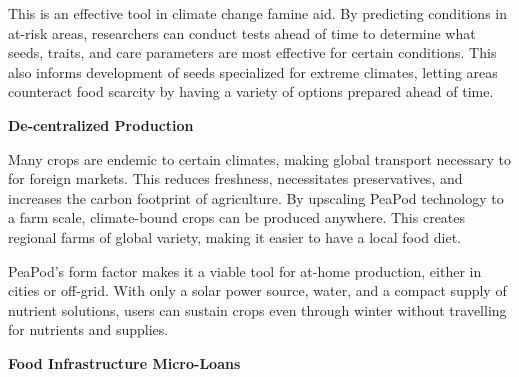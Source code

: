 \documentclass{report}
\begin{document}
This is an effective tool in climate change famine aid. By predicting conditions in at-risk areas, researchers can conduct tests ahead of time to determine what seeds, traits, and care parameters are most effective for certain conditions. This also informs development of seeds specialized for extreme climates, letting areas counteract food scarcity by having a variety of options prepared ahead of time.

\textbf{De-centralized Production}

Many crops are endemic to certain climates, making global transport necessary to for foreign markets. This reduces freshness, necessitates preservatives, and increases the carbon footprint of agriculture. By upscaling PeaPod technology to a farm scale, climate-bound crops can be produced anywhere. This creates regional farms of global variety, making it easier to have a local food diet.

PeaPod's form factor makes it a viable tool for at-home production, either in cities or off-grid. With only a solar power source, water, and a compact supply of nutrient solutions, users can sustain crops even through winter without travelling for nutrients and supplies.





\textbf{Food Infrastructure Micro-Loans}
\end{document}
